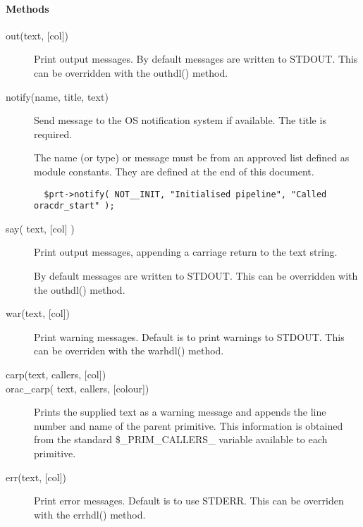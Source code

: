 \paragraph*{Methods\label{ORAC::Print_Methods}}
\begin{description}

\item[{out(text, [col])}] \mbox{}

Print output messages.
By default messages are written to STDOUT. This can be overridden with
the outhdl() method.


\item[{notify(name, title, text)}] \mbox{}

Send message to the OS notification system if available. The title
is required.



The name (or type) or message must be from an approved list defined
as module constants. They are defined at the end of this document.

\begin{verbatim}
  $prt->notify( NOT__INIT, "Initialised pipeline", "Called oracdr_start" );
\end{verbatim}

\item[{say( text, [col] )}] \mbox{}

Print output messages, appending a carriage return to the text string.



By default messages are written to STDOUT. This can be overridden with the outhdl() method.


\item[{war(text, [col])}] \mbox{}

Print warning messages.
Default is to print warnings to STDOUT. This can be overriden with
the warhdl() method.


\item[{carp(text, callers, [col])}] \mbox{}
\item[{orac\_carp( text, callers, [colour])}] \mbox{}

Prints the supplied text as a warning message and appends the line number
and name of the parent primitive. This information is obtained from the
standard \$\_PRIM\_CALLERS\_ variable available to each primitive.


\item[{err(text, [col])}] \mbox{}

Print error messages.
Default is to use STDERR. This can be overriden with the errhdl()
method.



\end{description}
